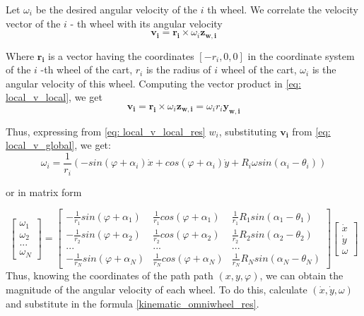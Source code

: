 \documentclass[oneside,final,14pt]{extreport}
\newcommand{\bs}{\boldsymbol}
\begin{document}
Let $ \omega_{i} $ be the desired angular velocity of the $ i $ th wheel.
We correlate the velocity vector of the $ i $ - th wheel with its angular velocity
\begin{equation}
\label{eq: local_v_local}
\bs{v_{i}}
=
\bs{r_{i}}
\times
\omega_{i}
\bs{z_{w, i}}
\end{equation}

Where $ \bs{r_{i}} $ is a vector having the coordinates $ [- r_{i}, 0,0] $ in the coordinate system of the $ i $ -th wheel of the cart, $ r_{i} $ is the radius of $ i $ wheel of the cart, $ \omega_{i} $ is the angular velocity of this wheel.
Computing the vector product in \ref{eq: local_v_local}, we get
\begin{equation}
\label{eq: local_v_local_res}
\bs{v_{i}}
=
\bs{r_{i}}
\times
\omega_{i}
\bs{z_{w, i}}
=
\omega_{i}
r_{i}
\bs{y_{w, i}}
\end{equation}

Thus, expressing from \ref{eq: local_v_local_res} $ w_{i} $, substituting $ \bs{v_{i}} $ from \ref{eq: local_v_global}, we get:
\begin{equation}
\omega_{i}
=
\frac{1}{r_{i}}
(
-sin (\varphi + \alpha_{i}) \dot{x}
+ cos (\varphi + \alpha_{i}) \dot{y}
+
R_{i}
\omega
sin (\alpha_{i} - \theta_{i})
)
\end{equation}

or in matrix form

\begin{equation}
\label{kinematic_omniwheel_res}
\begin{bmatrix}
\omega_{1} \\
\omega_{2} \\
... \\
\omega_{N}
\end{bmatrix}
=
\begin{bmatrix}
- \frac{1}{r_{1}} sin (\varphi + \alpha_{1}) &
\frac{1}{r_{1}} cos (\varphi + \alpha_{1}) &
\frac{1}{r_{1}} R_{1} sin (\alpha_{1} - \theta_{1})
\\
- \frac{1}{r_{2}} sin (\varphi + \alpha_{2}) &
\frac{1}{r_{2}} cos (\varphi + \alpha_{2}) &
\frac{1}{r_{2}} R_{2} sin (\alpha_{2} - \theta_{2})
\\
... & ... & ...
\\
- \frac{1}{r_{N}} sin (\varphi + \alpha_{N}) &
\frac{1}{r_{N}} cos (\varphi + \alpha_{N}) &
\frac{1}{r_{N}} R_{N} sin (\alpha_{N} - \theta_{N})
\end{bmatrix}
\begin{bmatrix}
\dot{x} \\
\dot{y} \\
\omega
\end{bmatrix}
\end{equation}
Thus, knowing the coordinates of the path path $ (x, y, \varphi) $, we can obtain the magnitude of the angular velocity of each wheel. To do this, calculate $ (\dot{x}, \dot{y}, \omega) $ and substitute in the formula \ref{kinematic_omniwheel_res}.
\end{document}
